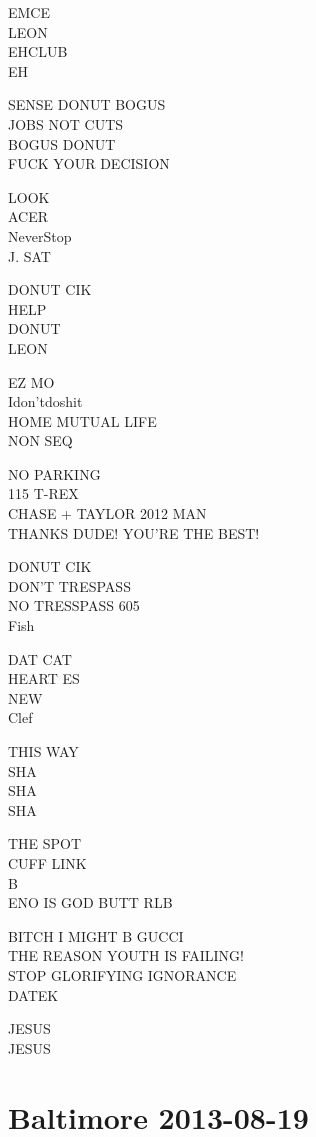\documentclass[10pt,letterpaper]{article}
\begin{document}
EMCE\\
LEON\\
EHCLUB\\
EH

SENSE DONUT BOGUS\\
JOBS NOT CUTS\\
BOGUS DONUT\\
FUCK YOUR DECISION

LOOK\\
ACER\\
NeverStop\\
J. SAT

DONUT CIK\\
HELP\\
DONUT\\
LEON

EZ MO\\
Idon'tdoshit\\
HOME MUTUAL LIFE\\
NON SEQ

NO PARKING\\
115 T{-}REX\\
CHASE + TAYLOR 2012 MAN\\
THANKS DUDE! YOU'RE THE BEST!

DONUT CIK\\
DON'T TRESPASS\\
NO TRESSPASS 605\\
Fish

DAT CAT\\
HEART ES\\
NEW\\
Clef

THIS WAY\\
SHA\\
SHA\\
SHA

THE SPOT\\
CUFF LINK\\
B\\
ENO IS GOD BUTT RLB

BITCH I MIGHT B GUCCI\\
THE REASON YOUTH IS FAILING!\\
STOP GLORIFYING IGNORANCE\\
DATEK

JESUS\\
JESUS


\section*{Baltimore 2013-08-19}
\end{document}
